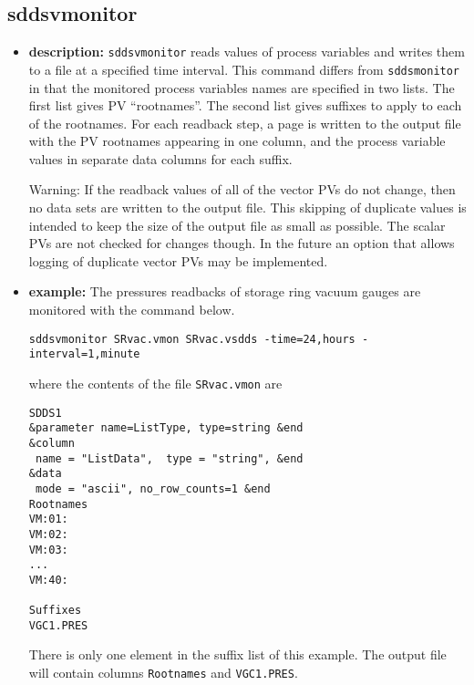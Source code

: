 %
%
\begin{latexonly}
\newpage
\end{latexonly}

%
%
\subsection{sddsvmonitor}
\label{sddsvmonitor}

\begin{itemize}
\item {\bf description:}
%
%
\verb+sddsvmonitor+ reads values of process variables and writes them to a file at a specified time interval.
This command differs from \verb+sddsmonitor+ in that the monitored
process variables names are specified in two lists.  The first list
gives PV ``rootnames''.  The second list gives suffixes to apply to
each of the rootnames. For each readback step, a page is written to
the output file with the PV rootnames appearing in one column, and the
process variable values in separate data columns for each suffix.

Warning: If the readback values of all of the vector PVs do not
change, then no data sets are written to the output file. This
skipping of duplicate values is intended to keep the size of the
output file as small as possible.  The scalar PVs are not checked for
changes though. In the future an option that allows logging of duplicate
vector PVs may be implemented.

\item {\bf example:} 
%
% 
%
The pressures readbacks of storage ring vacuum gauges are monitored with the command below.
\begin{verbatim}
sddsvmonitor SRvac.vmon SRvac.vsdds -time=24,hours -interval=1,minute
\end{verbatim}
where the contents of the file \verb+SRvac.vmon+ are
\begin{verbatim}
SDDS1
&parameter name=ListType, type=string &end
&column
 name = "ListData",  type = "string", &end
&data
 mode = "ascii", no_row_counts=1 &end
Rootnames
VM:01:
VM:02:
VM:03:
...
VM:40:

Suffixes
VGC1.PRES
\end{verbatim}
There is only one element in the suffix list of this example. The output file will contain columns 
\verb+Rootnames+ and \verb+VGC1.PRES+.


\end{itemize}
